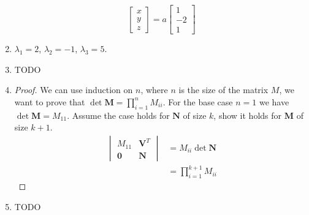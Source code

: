 \documentclass[a4paper]{article}
\newcommand{\vect}{\mathbf}
\begin{document}
\begin{enumerate}
\begin{equation*}
		\left[
		\begin{matrix}
			x\\
			y\\
			z
		\end{matrix}
		\right]
		=
		a
		\left[
		\begin{matrix}
			1\\
			-2\\
			1
		\end{matrix}
		\right]
	\end{equation*}
\item $\lambda_1=2$, $\lambda_2=-1$, $\lambda_3=5$.
\item TODO
\item \begin{proof}
		We can use induction on $n$, where $n$ is the size of the matrix $M$, we want to prove that $\det \mathbf{M} = \prod_{i=1}^{n}M_{ii}$. For the base case $n = 1$ we have $\det \mathbf{M} = M_{11}$.
		Assume the case holds for $\mathbf{N}$ of size $k$, show it holds for $\mathbf{M}$ of size $k + 1$.
		\begin{align*}
			\begin{vmatrix}
				M_{11} & \vect{V}^T\\
				\mathbf{0} & \mathbf{N}
			\end{vmatrix}
			&=
			M_{ii} \det \mathbf{N}\\
			&=
			\prod_{i=1}^{k+1}M_{ii}
		\end{align*}
\end{proof}
\item TODO
\end{enumerate}
\end{document}
